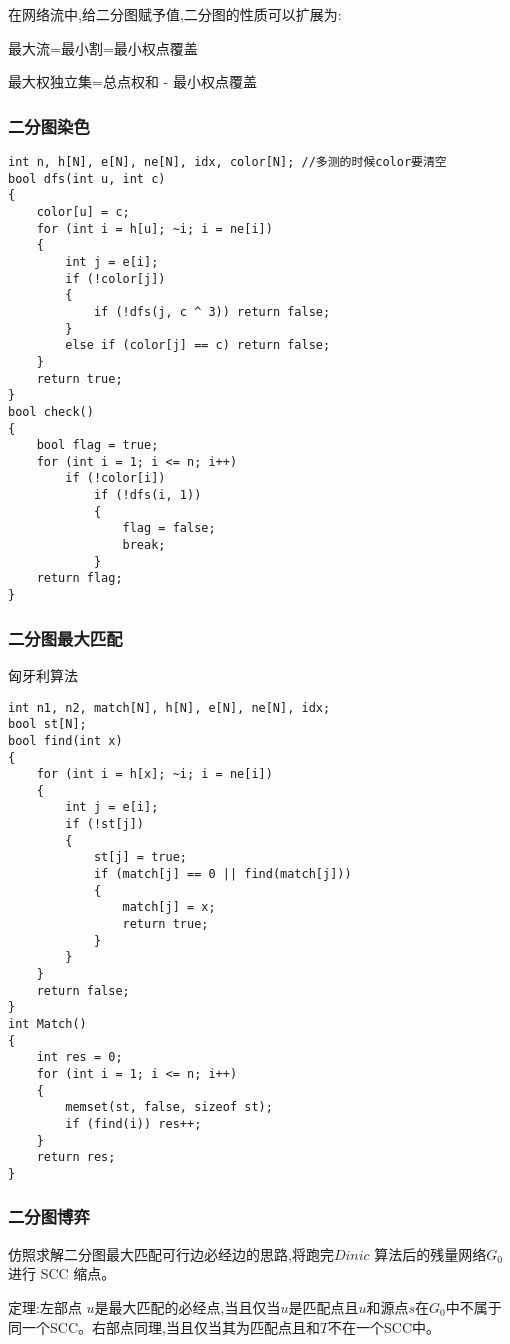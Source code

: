 \documentclass[a4paper, fontset=none]{ctexart}
\begin{document}
在网络流中,给二分图赋予值,二分图的性质可以扩展为:

最大流=最小割=最小权点覆盖

最大权独立集=总点权和 - 最小权点覆盖
\subsubsection{二分图染色}

\begin{verbatim}
int n, h[N], e[N], ne[N], idx, color[N]; //多测的时候color要清空
bool dfs(int u, int c)
{
    color[u] = c;
    for (int i = h[u]; ~i; i = ne[i])
    {
        int j = e[i];
        if (!color[j])
        {
            if (!dfs(j, c ^ 3)) return false;
        }
        else if (color[j] == c) return false;
    }
    return true;
}
bool check()
{
    bool flag = true;
    for (int i = 1; i <= n; i++)
        if (!color[i])
            if (!dfs(i, 1))
            {
                flag = false;
                break;
            }
    return flag;
}
\end{verbatim}
\subsubsection{二分图最大匹配}

匈牙利算法

\begin{verbatim}
int n1, n2, match[N], h[N], e[N], ne[N], idx;
bool st[N];
bool find(int x)
{
    for (int i = h[x]; ~i; i = ne[i])
    {
        int j = e[i];
        if (!st[j])
        {
            st[j] = true;
            if (match[j] == 0 || find(match[j]))
            {
                match[j] = x;
                return true;
            }
        }
    }
    return false;
}
int Match()
{
    int res = 0;
    for (int i = 1; i <= n; i++)
    {
        memset(st, false, sizeof st);
        if (find(i)) res++;
    }
    return res;
}
\end{verbatim}
\subsubsection{二分图博弈}

仿照求解二分图最大匹配可行边必经边的思路,将跑完$Dinic$ 算法后的残量网络$G_0$进行 SCC 缩点。

定理:左部点 $u$是最大匹配的必经点,当且仅当$u$是匹配点且$u$和源点$s$在$G_0$中不属于同一个SCC。右部点同理,当且仅当其为匹配点且和$T$不在一个SCC中。
\end{document}
